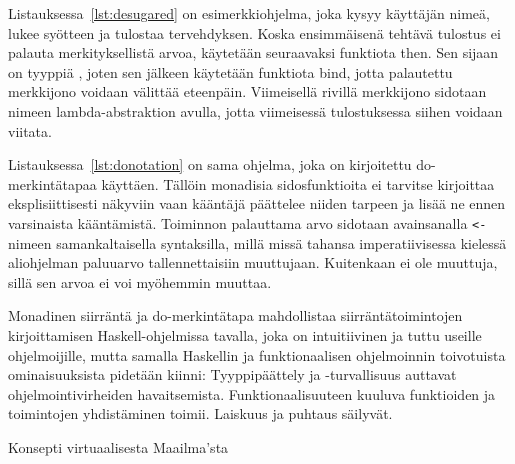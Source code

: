 \documentclass[finnish]{tktltiki2}
\begin{document}
Listauksessa~\ref{lst:desugared} on esimerkkiohjelma, joka kysyy käyttäjän nimeä, lukee syötteen ja
tulostaa tervehdyksen. Koska ensimmäisenä tehtävä tulostus ei palauta merkityksellistä arvoa,
käytetään seuraavaksi funktiota then. Sen sijaan  on tyyppiä , joten
sen jälkeen käytetään funktiota bind, jotta palautettu merkkijono voidaan välittää eteenpäin.
Viimeisellä rivillä merkkijono sidotaan nimeen  lambda-abstraktion avulla, jotta
viimeisessä tulostuksessa siihen voidaan viitata.

Listauksessa~\ref{lst:donotation} on sama ohjelma, joka on kirjoitettu do-merkintätapaa käyttäen.
Tällöin monadisia sidosfunktioita ei tarvitse kirjoittaa eksplisiittisesti näkyviin vaan kääntäjä
päättelee niiden tarpeen ja lisää ne ennen varsinaista kääntämistä. Toiminnon 
palauttama arvo sidotaan avainsanalla \verb|<-| nimeen samankaltaisella syntaksilla, millä missä
tahansa imperatiivisessa kielessä aliohjelman paluuarvo tallennettaisiin muuttujaan. Kuitenkaan
 ei ole muuttuja, sillä sen arvoa ei voi myöhemmin muuttaa.

Monadinen siirräntä ja do-merkintätapa mahdollistaa siirräntätoimintojen kirjoittamisen
Haskell-ohjelmissa tavalla, joka on intuitiivinen ja tuttu useille ohjelmoijille, mutta samalla
Haskellin ja funktionaalisen ohjelmoinnin toivotuista ominaisuuksista pidetään kiinni:
Tyyppipäättely ja -turvallisuus auttavat ohjelmointivirheiden havaitsemista. Funktionaalisuuteen
kuuluva funktioiden ja toimintojen yhdistäminen toimii. Laiskuus ja puhtaus säilyvät.




Konsepti virtuaalisesta Maailma'sta

%
%
\end{document}
